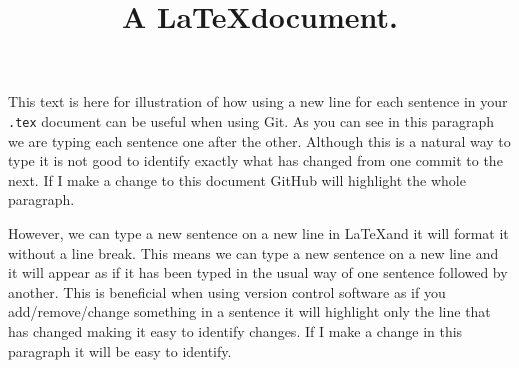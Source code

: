 \documentclass{article}
\begin{document}
	\title{A \LaTeX document.}
	\date{}
	\maketitle
	
	This text is here for illustration of how using a new line for each sentence in your \texttt{.tex} document can be useful when using Git. As you can see in this paragraph we are typing each sentence one after the other. Although this is a natural way to type it is not good to identify exactly what has changed from one commit to the next. If I make a change to this document GitHub will highlight the whole paragraph.
	
	However, we can type a new sentence on a new line in \LaTeX and it will format it without a line break.
	This means we can type a new sentence on a new line and it will appear as if it has been typed in the usual way of one sentence followed by another.
	This is beneficial when using version control software as if you add/remove/change something in a sentence it will highlight only the line that has changed making it easy to identify changes.
	If I make a change in this paragraph it will be easy to identify.
	
\end{document}
